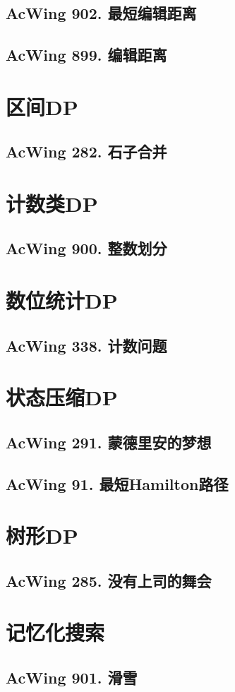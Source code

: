 \subsection{AcWing 902. 最短编辑距离}

\subsection{AcWing 899. 编辑距离}


\section{区间DP}

\subsection{AcWing 282. 石子合并}


\section{计数类DP}

\subsection{AcWing 900. 整数划分}


\section{数位统计DP}

\subsection{AcWing 338. 计数问题}


\section{状态压缩DP}

\subsection{AcWing 291. 蒙德里安的梦想}

\subsection{AcWing 91. 最短Hamilton路径}


\section{树形DP}

\subsection{AcWing 285. 没有上司的舞会}


\section{记忆化搜索}

\subsection{AcWing 901. 滑雪}
